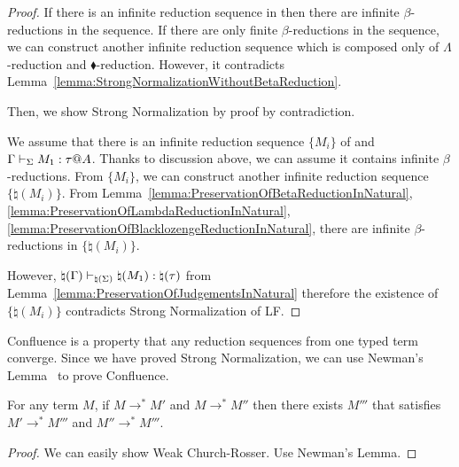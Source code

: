 \begin{proof}

    If there is an infinite reduction sequence in \LMD then there are infinite \( \beta \)-reductions in the sequence. If there are only finite \( \beta \)-reductions in the sequence, we can construct another infinite reduction sequence which is composed only of \( \Lambda \)-reduction and \( \blacklozenge \)-reduction. However, it contradicts Lemma~\ref{lemma:StrongNormalizationWithoutBetaReduction}.
    
    Then, we show Strong Normalization by proof by contradiction. 
    
    We assume that there is an infinite reduction sequence \( \{ M_i \} \) of \LMD and \( \G\V M_1:\tau@A \). Thanks to discussion above, we can assume it contains infinite \( \beta \)-reductions. From \( \{ M_i \} \), we can construct another infinite reduction sequence \( \{ \natural(M_i) \} \). From Lemma~\ref{lemma:PreservationOfBetaReductionInNatural}, \ref{lemma:PreservationOfLambdaReductionInNatural}, \ref{lemma:PreservationOfBlacklozengeReductionInNatural}, there are infinite \( \beta \)-reductions in \( \{ \natural(M_i) \} \).
    
    However, \( \natural(\Gamma) \vdash_{\natural(\Sigma)} \natural(M_1):\natural(\tau) \) from Lemma~\ref{lemma:PreservationOfJudgementsInNatural} therefore the existence of \( \{ \natural(M_i) \} \) contradicts Strong Normalization of LF.
\end{proof}

Confluence is a property that any reduction sequences from one typed term
converge.  Since we have proved Strong Normalization, we can use Newman's
Lemma~\cite{BaaderTobias1998TermRewriting} to prove Confluence.

\begin{theorem}[Confluence]
    \label{theorem:confluence}
	For any term $M$, if $M \longrightarrow^* M'$ and $M \longrightarrow^* M''$ then
	there exists $M'''$ that satisfies $M' \longrightarrow^* M'''$ and $M'' \longrightarrow^* M'''$.
\end{theorem}

\begin{proof}
  We can easily show Weak Church-Rosser. Use Newman's Lemma.
\end{proof}

